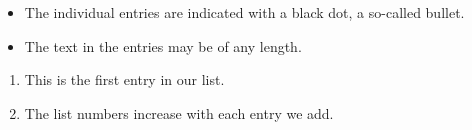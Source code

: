 \documentclass{article}
\begin{document}
\begin{itemize}
  \item The individual entries are indicated with a black dot, a so-called bullet.
  \item The text in the entries may be of any length.
\end{itemize}

\begin{enumerate}
  \item This is the first entry in our list.
  \item The list numbers increase with each entry we add.
\end{enumerate}
\end{document}
